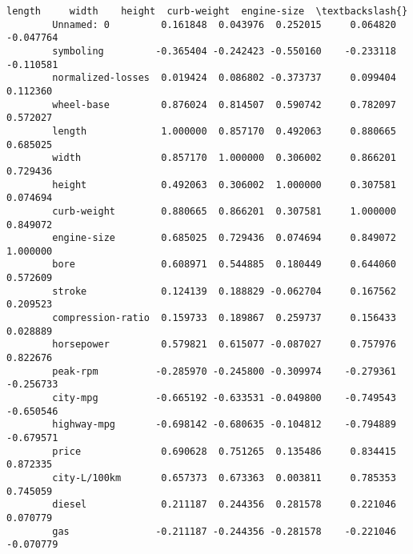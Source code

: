 \documentclass[11pt]{article}
\begin{document}
\begin{Verbatim}[commandchars=\\\{\}]
                             length     width    height  curb-weight  engine-size  \textbackslash{}
        Unnamed: 0         0.161848  0.043976  0.252015     0.064820    -0.047764   
        symboling         -0.365404 -0.242423 -0.550160    -0.233118    -0.110581   
        normalized-losses  0.019424  0.086802 -0.373737     0.099404     0.112360   
        wheel-base         0.876024  0.814507  0.590742     0.782097     0.572027   
        length             1.000000  0.857170  0.492063     0.880665     0.685025   
        width              0.857170  1.000000  0.306002     0.866201     0.729436   
        height             0.492063  0.306002  1.000000     0.307581     0.074694   
        curb-weight        0.880665  0.866201  0.307581     1.000000     0.849072   
        engine-size        0.685025  0.729436  0.074694     0.849072     1.000000   
        bore               0.608971  0.544885  0.180449     0.644060     0.572609   
        stroke             0.124139  0.188829 -0.062704     0.167562     0.209523   
        compression-ratio  0.159733  0.189867  0.259737     0.156433     0.028889   
        horsepower         0.579821  0.615077 -0.087027     0.757976     0.822676   
        peak-rpm          -0.285970 -0.245800 -0.309974    -0.279361    -0.256733   
        city-mpg          -0.665192 -0.633531 -0.049800    -0.749543    -0.650546   
        highway-mpg       -0.698142 -0.680635 -0.104812    -0.794889    -0.679571   
        price              0.690628  0.751265  0.135486     0.834415     0.872335   
        city-L/100km       0.657373  0.673363  0.003811     0.785353     0.745059   
        diesel             0.211187  0.244356  0.281578     0.221046     0.070779   
        gas               -0.211187 -0.244356 -0.281578    -0.221046    -0.070779   
        

\end{Verbatim}
\end{document}
